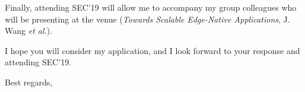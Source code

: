 \documentclass[english, 11pt]{kthletter}
\begin{document}
\begin{letter}
Finally, attending SEC'19 will allow me to accompany my group colleagues who will be presenting at the venue (\emph{Towards Scalable Edge-Native Applications}, J. Wang \emph{et al.}).

I hope you will consider my application, and I look forward to your response and attending SEC'19.

\closing{Best regards,}

\end{letter}
\end{document}

